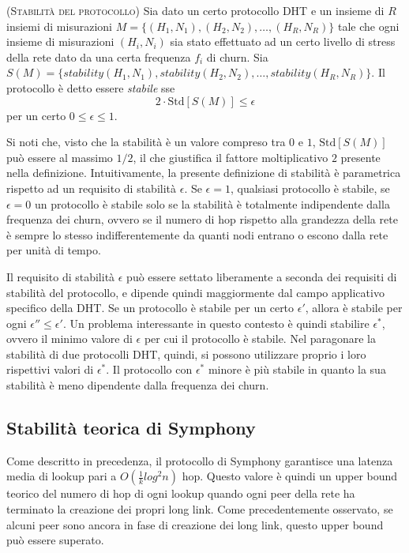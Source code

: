 \documentclass[prodmode,acmtap]{acmlarge}
\begin{document}
\begin{definition}{(\textsc{Stabilità del protocollo})}
Sia dato un certo protocollo DHT e un insieme di $R$ insiemi di misurazioni $M=\{ (H_1,N_1), (H_2,N_2), \dots, (H_R,N_R) \}$ tale che ogni insieme di misurazioni $(H_i,N_i)$ sia stato effettuato ad un certo livello di stress della rete dato da una certa frequenza $f_i$ di churn. Sia $S(M) = \{ stability(H_1,N_1), stability(H_2,N_2), \dots, stability(H_R,N_R) \}$. Il protocollo è detto essere \emph{stabile} sse
$$ 2 \cdot \mathrm{Std}[S(M)] \leq \epsilon $$
per un certo $0 \le \epsilon \le 1$.
\end{definition}

Si noti che, visto che la stabilità è un valore compreso tra $0$ e $1$, $\mathrm{Std}[S(M)]$ può essere al massimo $1/2$, il che giustifica il fattore moltiplicativo $2$ presente nella definizione. Intuitivamente, la presente definizione di stabilità è parametrica rispetto ad un requisito di stabilità $\epsilon$. Se $\epsilon=1$, qualsiasi protocollo è stabile, se $\epsilon=0$ un protocollo è stabile solo se la stabilità è totalmente indipendente dalla frequenza dei churn, ovvero se il numero di hop rispetto alla grandezza della rete è sempre lo stesso indifferentemente da quanti nodi entrano o escono dalla rete per unità di tempo.

Il requisito di stabilità $\epsilon$ può essere settato liberamente a seconda dei requisiti di stabilità del protocollo, e dipende quindi maggiormente dal campo applicativo specifico della DHT. Se un protocollo è stabile per un certo $\epsilon'$, allora è stabile per ogni $\epsilon'' \le \epsilon'$. Un problema interessante in questo contesto è quindi stabilire $\epsilon^*$, ovvero il minimo valore di $\epsilon$ per cui il protocollo è stabile. Nel paragonare la stabilità di due protocolli DHT, quindi, si possono utilizzare proprio i loro rispettivi valori di $\epsilon^*$. Il protocollo con $\epsilon^*$ minore è più stabile in quanto la sua stabilità è meno dipendente dalla frequenza dei churn.


\subsection{Stabilità teorica di Symphony} \label{stab-teorica}
Come descritto in precedenza, il protocollo di Symphony garantisce una latenza media di lookup pari a $O(\frac{1}{k}log^2n)$ hop. Questo valore è quindi un upper bound teorico del numero di hop di ogni lookup quando ogni peer della rete ha terminato la creazione dei propri long link. Come precedentemente osservato, se alcuni peer sono ancora in fase di creazione dei long link, questo upper bound può essere superato.
\end{document}
